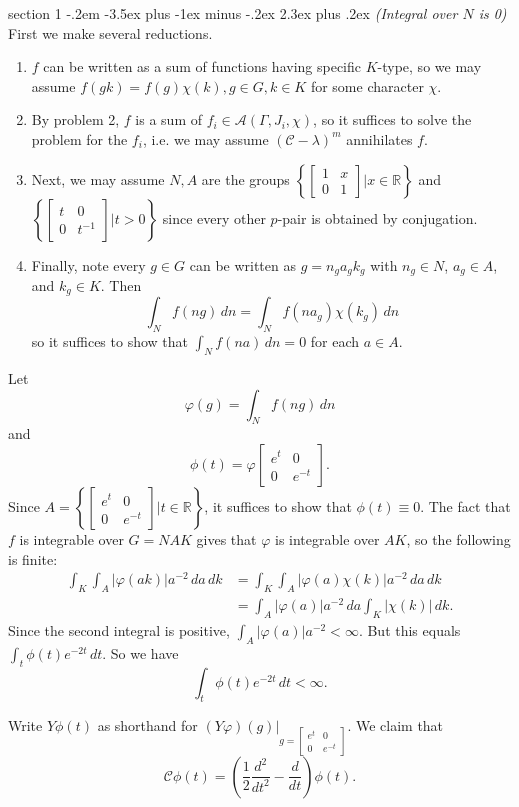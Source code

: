 \documentclass[12pt]{article}
\makeatletter
\theoremstyle{norm}
\newcommand{\R}[0]{\mathbb{R}}
\providecommand{\cal}[1]{\mathcal{#1}}
\renewcommand{\cal}[1]{\mathcal{#1}}
\newcommand{\rc}[1]{\frac{1}{#1}}
\newcommand{\Ga}[0]{\Gamma}
\newcommand{\la}[0]{\lambda}
\newcommand{\ph}[0]{\varphi}
\newcommand{\bc}[1]{\left\{ {#1} \right\}}
\newcommand{\pa}[1]{\left( {#1} \right)}
\newcommand{\matt}[4]{
\left[
\begin{matrix}
{#1}&{#2}\\
{#3}&{#4}
\end{matrix}
\right]}
\newcommand{\smatt}[4]{
\left[
\begin{smallmatrix}
{#1}&{#2}\\
{#3}&{#4}
\end{smallmatrix}
\right]}
\newcommand{\iy}[0]{\infty}
\newenvironment{problem}{\@startsection
       {section}
       {1}
       {-.2em}
       {-3.5ex plus -1ex minus -.2ex}
       {2.3ex plus .2ex}
       {\pagebreak[3]%
       \large\bf\noindent{Problem }
       }
       }
       {
       }
\makeatother
\begin{document}
\begin{problem}{\it (Integral over $N$ is 0)}
First we make several reductions.
\begin{enumerate}
\item $f$ can be written as a sum of functions having specific $K$-type, so we may assume $f(gk)=f(g)\chi(k),g\in G,k\in K$ for some character $\chi$. 
\item By problem 2, $f$ is a sum of $f_i\in \cal A(\Ga,J_i,\chi)$, so it suffices to solve the problem for the $f_i$, i.e. we may assume $(\cal C-\la)^m$ annihilates $f$. 
\item Next, we may assume $N,A$ are the groups $\bc{\smatt 1x01|x\in \R}$ and $\bc{\smatt t00{t^{-1}}|t>0}$ since every other $p$-pair is obtained by conjugation. 
\item Finally, note every $g\in G$ can be written as $g=n_ga_gk_g$ with $n_g\in N$, $a_g\in A$, and $k_g\in K$. Then
\[
\int_Nf(ng)\,dn=\int_Nf(na_g)\chi(k_g)\,dn
\]
so it suffices to show that $\int_N f(na)\,dn=0$ for each $a\in A$.
\end{enumerate}

Let
\[
\ph(g)=\int_N f(ng)\,dn
\]
and
\[
\phi(t)=\ph\matt{e^t}{0}{0}{e^{-t}}.
\]
Since $A=\bc{\smatt{e^t}{0}{0}{e^{-t}}|t\in \R}$, it suffices to show that $\phi(t)\equiv 0$. The fact that $f$ is integrable over $G=NAK$ gives that $\ph$ is integrable over $AK$, so the following is finite:
\begin{align*}
\int_K\int_A |\ph(ak)|a^{-2}\,da\,dk
&=\int_K\int_A |\ph(a)\chi(k)|a^{-2}\,da\,dk\\
&=\int_A|\ph(a)|a^{-2}\,da \int_K |\chi(k)|\,dk.
\end{align*}
Since the second integral is positive, $\int_A|\ph(a)|a^{-2}<\iy$. But this equals $\int_t \phi(t)e^{-2t}\,dt$. So we have
%
%
\begin{equation}\label{finite}
\int_t \phi(t)e^{-2t}\,dt<\iy.
\end{equation}

Write $Y\phi(t)$ as shorthand for $(Y\ph)(g)|_{g=\smatt{e^t}00{e^{-t}}}$. %
We claim that
\begin{equation}\label{caction}
\cal C\phi(t)=\pa{\rc2\frac{d^2}{dt^2}-\frac{d}{dt}}\phi(t).
\end{equation}


\end{problem}
\end{document}
